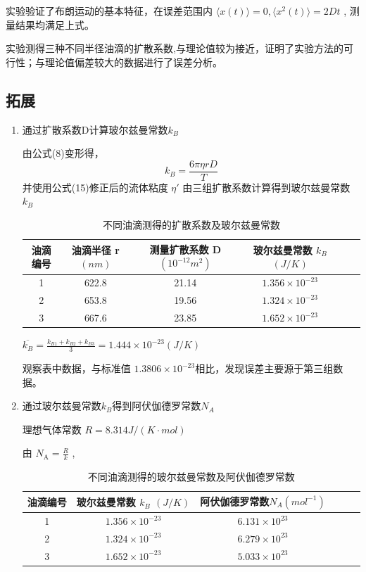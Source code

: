 \documentclass[12pt,a4paper,UTF8]{ctexart}
\begin{document}
实验验证了布朗运动的基本特征，在误差范围内
$\langle x(t)\rangle =0 ,\langle x^2(t)\rangle =2Dt$ ,
测量结果均满足上式。

实验测得三种不同半径油滴的扩散系数,与理论值较为接近，证明了实验方法的可行性；与理论值偏差较大的数据进行了误差分析。
\subsection*{拓展}
\begin{enumerate}
\item 通过扩散系数D计算玻尔兹曼常数$k_B$

由公式(8)变形得，
\begin{equation}
		k_B=\frac{6 \pi \eta r D}{T}
	\end{equation}
并使用公式(15)修正后的流体粘度 $\eta'$
由三组扩散系数计算得到玻尔兹曼常数$k_B$

\begin{table}[htbp]
  \centering
  \begin{tabular}{cccccc}
    \toprule
    油滴编号 &油滴半径 r$(nm)$ &测量扩散系数 D $(10^{-12}m^2)$ &玻尔兹曼常数 $k_B$ $(J/K)$\\
    \midrule
    1 &622.8 &21.14 & $1.356 \times 10^{-23}$ \\
    2 &653.8 &19.56 & $1.324 \times 10^{-23}$\\
    3 &667.6 &23.85 & $1.652 \times 10^{-23}$ \\
    \bottomrule
  \end{tabular}
  \caption{不同油滴测得的扩散系数及玻尔兹曼常数}
  \label{tab:data}
\end{table}

$\overline{k_B}=\frac{k_{B1}+k_{B2}+k_{B3}}{3}=1.444 \times 10^{-23}(J/K)$

观察表中数据，与标准值 $1.3806 \times 10^{-23}$相比，发现误差主要源于第三组数据。

\item 通过玻尔兹曼常数$k_B$得到阿伏伽德罗常数$N_A$

理想气体常数 $R=8.314J/(K \cdot mol)$

由 $N_{\text{A}} = \frac{R}{k}$ ,

\begin{table}[htbp]
  \centering
  \begin{tabular}{cccccc}
    \toprule
    油滴编号 &玻尔兹曼常数 $k_B$ $(J/K)$ & 阿伏伽德罗常数$N_A(mol^{-1})$\\
    \midrule
    1 & $1.356 \times 10^{-23}$ & $6.131 \times 10^{23}$ \\
    2 & $1.324 \times 10^{-23}$ & $6.279 \times 10^{23}$\\
    3 & $1.652 \times 10^{-23}$ & $5.033 \times 10^{23}$\\
    \bottomrule
  \end{tabular}
  \caption{不同油滴测得的玻尔兹曼常数及阿伏伽德罗常数}
  \label{tab:data}
\end{table}


\end{enumerate}
\end{document}

